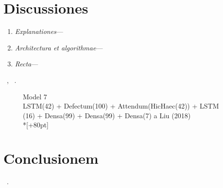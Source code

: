 \documentclass[preprint,3p,times,twocolumn]{elsarticle}  %
\begin{document}
\section{Discussiones}\label{section:discussion}

\lipsum[30-30]
\begin{enumerate}[label=\roman*]
	\item \textit{Explanationes}---\lipsum[16-16]
	\item \textit{Architectura et algorithmae}---\lipsum[17-17]
	\item \textit{Recta}---\lipsum[18-18]
\end{enumerate}
\lipsum[19-21]~\citep{schuster97}, 
\lipsum[22-22]
~\citep{vaswani17}.
\iftogethersa
\else
\begin{figure}%
\centering
\begin{minipage}[t]{0.47\textwidth}
%
\centering
{}
%
\caption{Model 7\\\scriptsize LSTM(42) + Defectum(100) + Attendum(HicHaec(42))
         + LSTM (16) + Densa(99) + Densa(99) + Densa(7) 
         a Liu (2018)~\citep{liu18}\\*[+80pt]}
\label{fig:8}
\end{minipage}
\end{figure}
\fi
\section{Conclusionem}\label{section:conclusion}
~\citep{probst19}.  \lipsum[21-22]
\end{document}
